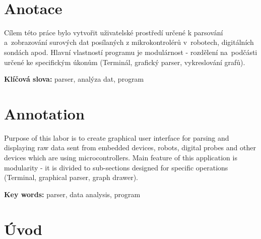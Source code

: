 \documentclass[12pt, a4paper, oneside]{article}
\newcommand{\D}{\medskip \noindent} %
\newcommand{\B}{\textbf} %
\begin{document}
\newpage   %
~ %
\vspace{10mm}

\section*{Anotace }

    Cílem této práce bylo vytvořit uživatelské prostředí určené k parsování a~zobrazování surových dat posílaných z mikrokontrolérů v~robotech, digitálních sondách apod. 
Hlavní vlastností programu je modulárnost - rozdělení na~podčásti určené ke specifickým úkonům (Terminál, grafický parser, vykreslování grafů).

\D \B{Klíčová slova:} parser, analýza dat, program

\section*{Annotation}

    Purpose of this labor is to create graphical user interface for parsing and displaying raw data sent from embedded devices, robots, digital probes and other devices which are using microcontrollers.
Main feature of this application is modularity - it is divided to sub-sections designed for specific operations (Terminal, graphical parser, graph drawer).

\D \B{Key words:} parser, data analysis, program

\addtolength{\textheight}{30mm} %

\newpage

\setlength{\voffset}{-20mm} %

\tableofcontents  %

\addtolength{\textheight}{-30mm} %
\newpage
\setlength{\voffset}{0mm} %
\pagestyle{plain}
\section*{Úvod}
\end{document}

